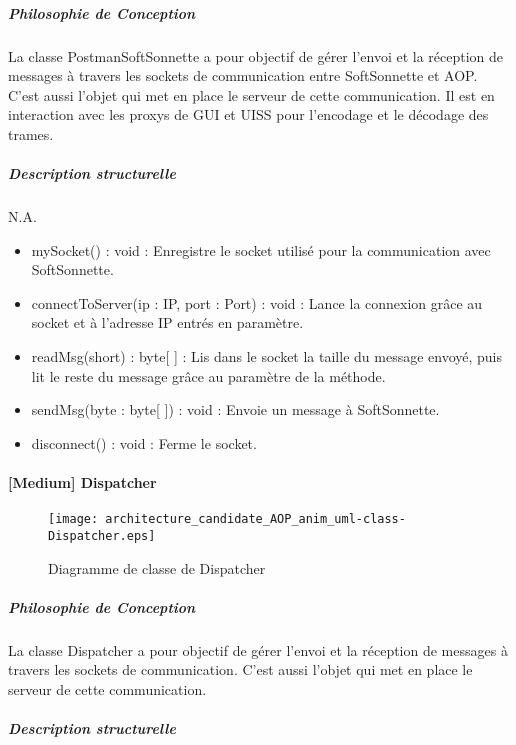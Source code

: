             \subparagraph{Philosophie de Conception}%
                
            La classe PostmanSoftSonnette a pour objectif de gérer l'envoi et la réception de messages à travers les sockets de communication entre SoftSonnette et AOP.
            C'est aussi l'objet qui met en place le serveur de cette communication.
            Il est en interaction avec les proxys de GUI et UISS pour l'encodage et le décodage des trames.            
            \subparagraph{Description structurelle}%
                
            N.A.
            \begin{itemize}
                \item {mySocket() : void : Enregistre le socket utilisé pour la communication avec SoftSonnette.}
                \item {connectToServer(ip : IP, port : Port) : void : Lance la connexion grâce au socket et à l'adresse IP entrés en paramètre.}
                \item {readMsg(short) : byte[ ] : Lis dans le socket la taille du message envoyé, puis lit le reste du message grâce au paramètre de la méthode.}
                \item {sendMsg(byte : byte[ ]) : void : Envoie un message à SoftSonnette.}
                \item {disconnect() : void : Ferme le socket.}
            \end{itemize} 
            \newpage

    \paragraph{[Medium] Dispatcher}

        \begin{figure} [H]
            \centering
            \texttt{[image: architecture\_candidate\_AOP\_anim\_uml-class-Dispatcher.eps]}
            \caption{Diagramme de classe de Dispatcher}
            \label{Classe-Dispatcher}
        \end{figure}
    
            \subparagraph{Philosophie de Conception}%
                
            La classe Dispatcher a pour objectif de gérer l'envoi et la réception de messages à travers les sockets de communication.
            C'est aussi l'objet qui met en place le serveur de cette communication.
            \subparagraph{Description structurelle}%
                

